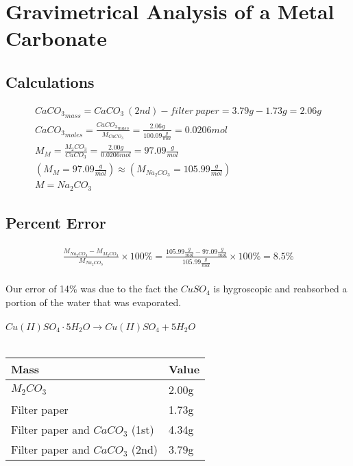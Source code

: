 \documentclass{article}
\begin{document}
\section{Gravimetrical Analysis of a Metal Carbonate}
\subsection{Calculations}
\begin{gather}
    {CaCO_3}_{mass} = CaCO_3\ (2nd) - filter\ paper = 3.79g - 1.73g = 2.06g \\
    {CaCO_3}_{moles} = \frac{{CaCO_3}_{mass}}{M_{CaCO_3}} = \frac{2.06g}{100.09\frac{g}{mol}} = 0.0206mol \\
    M_M = \frac{M_2CO_3}{CaCO_3} = \frac{2.00g}{0.0206mol} = 97.09\frac{g}{mol} \\
    \left( M_M = 97.09\frac{g}{mol} \right) \approx \left( M_{Na_2CO_3} = 105.99\frac{g}{mol} \right) \\
    M = Na_2CO_3
\end{gather}
\subsection{Percent Error}
\begin{gather}
    \frac{M_{Na_2CO_3} - M_{M_2CO_3}}{M_{Na_2CO_3}} \times 100\% = \frac{105.99\frac{g}{mol} - 97.09\frac{g}{mol}}{105.99\frac{g}{mol}} \times 100\% = 8.5\%
\end{gather}
\\
Our error of 14\% was due to the fact the \(CuSO_4\) is hygroscopic and reabsorbed a portion of the water that was evaporated.
\\\\
\(Cu(II)SO_4\cdot5H_2O \to Cu(II)SO_4 + 5H_2O\)
\\\\
\centering
\begin{tabular}{p{5cm}|p{2cm}}
    \toprule
    Mass & Value \\
    \midrule
    \(M_2CO_3\) & 2.00g \\
    Filter paper & 1.73g \\
    Filter paper and \(CaCO_3\) (1st) & 4.34g \\
    Filter paper and \(CaCO_3\) (2nd) & 3.79g \\
\end{tabular}
\end{document}
